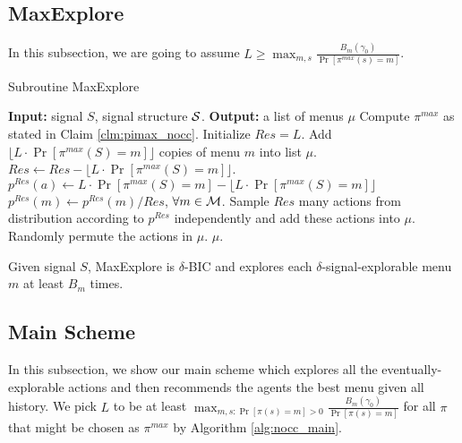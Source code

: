 \subsection{MaxExplore}
\label{sec:private_maxe}
In this subsection, we are going to assume $L \geq \max_{m,s} \frac{B_m(\gamma_0)}{ \Pr[\pi^{max}(s)=m]}$. 

 \begin{algorithm}[H]
    \caption{Subroutine MaxExplore}
    	\label{alg:nocc_explore}
    \begin{algorithmic}[1]
	\STATE \textbf{Input:} signal $S$, signal structure $\S$.
	\STATE \textbf{Output:} a list of menus $\mu$
	\STATE Compute $\pi^{max}$ as stated in Claim \ref{clm:pimax_nocc}.
		\STATE Initialize $Res = L$.
                     		\STATE Add $\lfloor L \cdot \Pr[\pi^{max}(S) = m]\rfloor$ copies of menu $m$ into list $\mu$.
			\STATE $Res \leftarrow Res -\lfloor L \cdot \Pr[\pi^{max}(S) = m] \rfloor $.
			\STATE $p^{Res}(a)\leftarrow  L \cdot \Pr[\pi^{max}(S) = m] -  \lfloor L \cdot \Pr[\pi^{max}(S) = m]\rfloor$
		\ENDFOR 
		\STATE $p^{Res}(m) \leftarrow p^{Res}(m) / Res$, $\forall m \in \M$. 
		\STATE Sample $Res$ many actions from distribution according to $p^{Res}$ independently and add these actions into $\mu$. 
		\STATE Randomly permute the actions in $\mu$.
	\RETURN $\mu$.	 
     \end{algorithmic}
\end{algorithm}

\begin{claim}
\label{clm:maxexplore_nocc}
Given signal $S$, MaxExplore is $\delta$-BIC and explores each $\delta$-signal-explorable menu $m$ at least $B_m$ times.  
\end{claim}


\subsection{Main Scheme}
\label{sec:private_main}
In this subsection, we show our main scheme which explores all the eventually-explorable actions and then recommends the agents the best menu given all history. We pick $L$ to be at least $\max_{m,s:\Pr[\pi(s)=m] >0} \frac{B_m(\gamma_0)}{ \Pr[\pi(s)=m]}$ for all $\pi$ that might be chosen as $\pi^{max}$ by Algorithm \ref{alg:nocc_main}.

